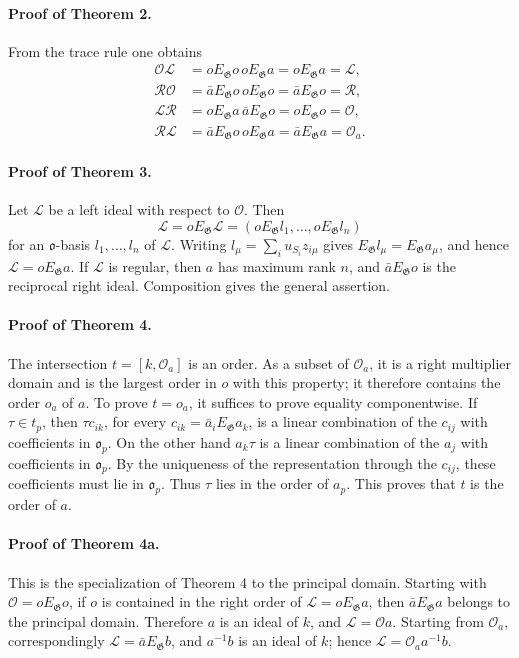 \documentclass[11pt]{article}
\providecommand{\Gg}{\mathfrak G}
\providecommand{\oo}{\mathfrak o}
\begin{document}
\paragraph{Proof of Theorem 2.}
From the trace rule one obtains
\[
\begin{aligned}
 \mathcal O\mathcal L&=oE_\Gg o\,oE_\Gg a=oE_\Gg a=\mathcal L,\\
 \mathcal R\mathcal O&=\bar aE_\Gg o\,oE_\Gg o=\bar aE_\Gg o=\mathcal R,\\
 \mathcal L\mathcal R&=oE_\Gg a\,\bar aE_\Gg o=oE_\Gg o=\mathcal O,\\
 \mathcal R\mathcal L&=\bar aE_\Gg o\,oE_\Gg a=\bar aE_\Gg a=\mathcal O_a.
\end{aligned}
\]

\paragraph{Proof of Theorem 3.}
Let \(\mathcal L\) be a left ideal with respect to \(\mathcal O\). Then
\[
        \mathcal L=oE_\Gg\mathcal L
        =(oE_\Gg l_1,\ldots,oE_\Gg l_n)
\]
for an \(\oo\)-basis \(l_1,\ldots,l_n\) of \(\mathcal L\). Writing \(l_\mu=\sum_i u_{S_i}z_{i\mu}\) gives \(E_\Gg l_\mu=E_\Gg a_\mu\), and hence \(\mathcal L=oE_\Gg a\). If \(\mathcal L\) is regular, then \(a\) has maximum rank \(n\), and \(\bar aE_\Gg o\) is the reciprocal right ideal. Composition gives the general assertion.

\paragraph{Proof of Theorem 4.}
The intersection \(t=[k,\mathcal O_a]\) is an order. As a subset of \(\mathcal O_a\), it is a right multiplier domain and is the largest order in \(o\) with this property; it therefore contains the order \(o_a\) of \(a\). To prove \(t=o_a\), it suffices to prove equality componentwise. If \(\tau\in t_p\), then \(\tau c_{ik}\), for every \(c_{ik}=\bar a_iE_\Gg a_k\), is a linear combination of the \(c_{ij}\) with coefficients in \(\oo_p\). On the other hand \(a_k\tau\) is a linear combination of the \(a_j\) with coefficients in \(\oo_p\). By the uniqueness of the representation through the \(c_{ij}\), these coefficients must lie in \(\oo_p\). Thus \(\tau\) lies in the order of \(a_p\). This proves that \(t\) is the order of \(a\).

\paragraph{Proof of Theorem 4a.}
This is the specialization of Theorem 4 to the principal domain. Starting with \(\mathcal O=oE_\Gg o\), if \(o\) is contained in the right order of \(\mathcal L=oE_\Gg a\), then \(\bar aE_\Gg a\) belongs to the principal domain. Therefore \(a\) is an ideal of \(k\), and \(\mathcal L=\mathcal O a\). Starting from \(\mathcal O_a\), correspondingly \(\mathcal L=\bar aE_\Gg b\), and \(a^{-1}b\) is an ideal of \(k\); hence \(\mathcal L=\mathcal O_a a^{-1}b\).
\end{document}
